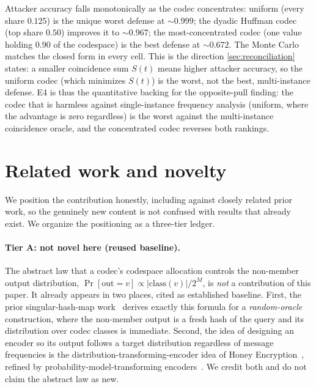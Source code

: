\documentclass[sigconf,nonacm,anonymous,balance=false]{acmart}
\newcommand{\class}{\mathrm{class}}
\begin{document}
Attacker accuracy falls monotonically as the codec concentrates: uniform (every share
$0.125$) is the unique worst defense at $\sim 0.999$; the dyadic Huffman codec (top share
$0.50$) improves it to $\sim 0.967$; the most-concentrated codec (one value holding $0.90$
of the codespace) is the best defense at $\sim 0.672$. The Monte Carlo matches the closed
form in every cell. This is the direction \cref{sec:reconciliation} states: a smaller
coincidence sum $S(t)$ means higher attacker accuracy, so the uniform codec (which
minimizes $S(t)$) is the worst, not the best, multi-instance defense. E4 is thus the
quantitative backing for the opposite-pull finding: the codec that is harmless against
single-instance frequency analysis (uniform, where the advantage is zero regardless) is the
worst against the multi-instance coincidence oracle, and the concentrated codec reverses
both rankings.

\section{Related work and novelty}
\label{sec:related}

We position the contribution honestly, including against closely related prior work, so
the genuinely new content is not confused with results that already exist. We organize the
positioning as a three-tier ledger.

\paragraph{Tier A: not novel here (reused baseline).}
The abstract law that a codec's codespace allocation controls the non-member output
distribution, $\Pr[\mathrm{out} = v] \propto |\class(v)|/2^M$, is \emph{not} a contribution
of this paper. It already appears in two places, cited as established baseline. First, the
prior singular-hash-map work~\cite{towell_bernoulli_maps} derives exactly this formula
for a \emph{random-oracle} construction, where the non-member output is a fresh hash of the
query and its distribution over codec classes is immediate. Second, the idea of designing an
encoder so its output follows a target distribution regardless of message frequencies is the
distribution-transforming-encoder idea of Honey Encryption~\cite{juels2014honey}, refined by
probability-model-transforming encoders~\cite{cheng2019pmte}. We credit both and do not claim
the abstract law as new.
\end{document}
